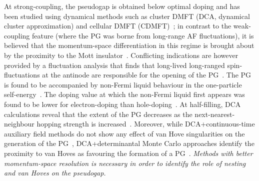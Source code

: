 At strong-coupling, the pseudogap is obtained below optimal doping and has been studied using dynamical methods such as cluster DMFT (DCA, dynamical cluster approximation) and cellular DMFT (CDMFT)~\cite{maier_2000,huscroft_2001,civelli_2005,parcollet_2004}; in contrast to the weak-coupling feature (where the PG was borne from long-range AF fluctuations), it is believed that the momentum-space differentiation in this regime is brought about by the proximity to the Mott insulator~\cite{civelli_2005}. Conflicting indications are however provided by a fluctuation analysis that finds that long-lived long-ranged spin-fluctuations at the antinode are responsible for the opening of the PG~\cite{Gunnarsson_2015}. The PG is found to be accompanied by non-Fermi liquid behaviour in the one-particle self-energy~\cite{huscroft_2001}. The doping value at which the non-Fermi liquid first appears was found to be lower for electron-doping than hole-doping~\cite{liebsch_2009}. At half-filling, DCA calculations reveal that the extent of the PG decreases as the next-nearest-neighbour hopping strength is increased~\cite{Gull_2009}. Moreover, while DCA+continuous-time auxiliary field methods do not show any effect of van Hove singularities on the generation of the PG~\cite{Gull_2009}, DCA+determinantal Monte Carlo approaches identify the proximity to van Hoves as favouring the formation of a PG~\cite{Wu_2020}. {\it Methods with better momentum-space resolution is necessary in order to identify the role of nesting and van Hoves on the pseudogap.}

